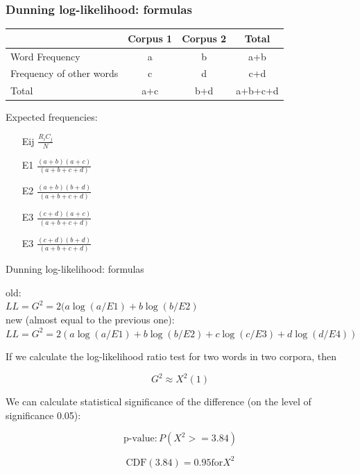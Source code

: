 \documentclass[svgnames]{beamer}
\begin{document}
\begin{frame}
  \frametitle{Dunning log-likelihood: formulas}
  \begin{tabular}[c]{|p{}|c|c|c|}
    \hline
   & Corpus 1 & Corpus 2 & Total \\
    \hline
    Word Frequency & a & b & a+b \\
    \hline
    Frequency of other words & c & d & c+d \\
    \hline
    Total & a+c & b+d & a+b+c+d \\
    \hline
  \end{tabular}

\bigskip
  Expected frequencies:
  \begin{itemize}
  \item[Eij] $\frac{R_iC_j}{N}$
  \item[E1] $\frac{(a+b)(a+c)}{(a+b+c+d)}$
  \item[E2] $\frac{(a+b)(b+d)}{(a+b+c+d)}$
  \item[E3] $\frac{(c+d)(a+c)}{(a+b+c+d)}$
  \item[E3] $\frac{(c+d)(b+d)}{(a+b+c+d)}$
  \end{itemize}

\end{frame}
\begin{frame}{Dunning log-likelihood: formulas}


  old:\\

  $LL = G^2 = 2 (a \log (a/E1) + b \log (b/E2)$ \\


  new (almost equal to the previous one):\\
  
  $LL = G^2 = 2 (a \log (a/E1) + b \log (b/E2) +c \log(c/E3) + d \log(d/E4))$



\end{frame}

\begin{frame}
  If we calculate the log-likelihood ratio test for two words in two corpora, then


    $$G^2 \approx X^2(1)$$


      We can calculate statistical significance of the difference (on the level of significance 0.05):

      $$\text{p-value}: P(X^2 >= 3.84)$$

      $$\text{CDF}(3.84) = 0.95 \text{for} X^2$$

\end{frame}
\end{document}
